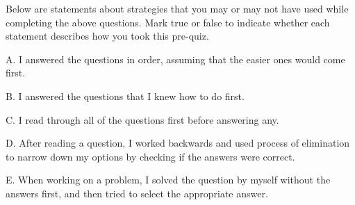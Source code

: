 \documentclass{ximera}
\begin{document}
\begin{question}

Below are statements about strategies that you may or may not have used while completing the above questions.  Mark true or false to indicate whether each statement describes how you took this pre-quiz. 

\begin{question}

    A. I answered the questions in order, assuming that the easier ones would come first.

    \begin{multipleChoice}
    \end{multipleChoice}
    
\end{question}
\begin{question}
    
    B. I answered the questions that I knew how to do first.

    \begin{multipleChoice}
    \end{multipleChoice}
    
\end{question}
\begin{question}
    
    C. I read through all of the questions first before answering any.

    \begin{multipleChoice}
    \end{multipleChoice}
    
\end{question}
\begin{question}
    
    D. After reading a question, I worked backwards and used process of elimination to narrow down my options by checking if the answers were correct.

    \begin{multipleChoice}
    \end{multipleChoice}
    
\end{question}  
\begin{question}    
    
    E. When working on a problem, I solved the question by myself without the answers first, and then tried to select the appropriate answer.


\end{question}
\end{question}
\end{document}
